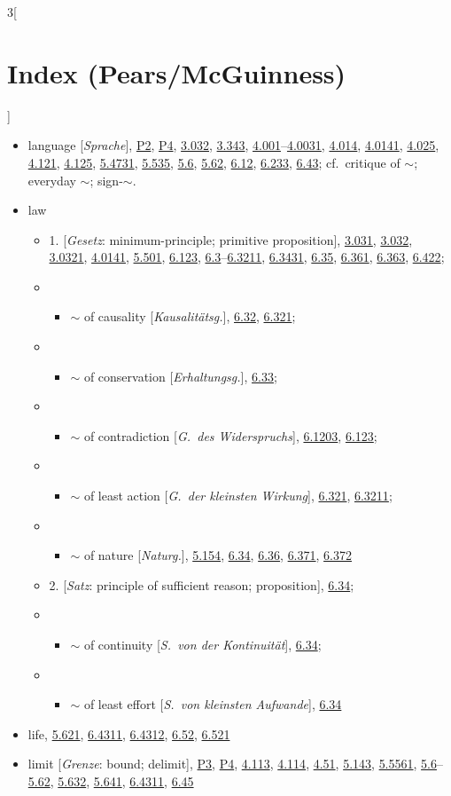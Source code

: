 \documentclass[oneside,openany,12pt]{book}
\newcommand{\indexentry}[1]{\item #1}
\newcommand{\indexsubentry}[1]{\begin{itemize} \item #1 \end{itemize}}
\newcommand{\indexsubsubentry}[1]{\begin{itemize} \item \begin{itemize} \item #1 \end{itemize} \end{itemize}}
\newcommand{\indexref}[1]{\hyperlink{prop#1}{#1}}
\newcommand{\indexgap}{\bigskip}
\begin{document}
\begin{multicols}{3}[\section*{Index (Pears/McGuinness)}]
\begin{itemize}
\indexgap

\indexentry{language [\textit{Sprache}], \hyperlink{pref2}{P2}, \hyperlink{pref4}{P4}, \indexref{3.032}, \indexref{3.343}, \indexref{4.001}--\indexref{4.0031}, \indexref{4.014}, \indexref{4.0141}, \indexref{4.025}, \indexref{4.121}, \indexref{4.125}, \indexref{5.4731}, \indexref{5.535}, \indexref{5.6}, \indexref{5.62}, \indexref{6.12}, \indexref{6.233}, \indexref{6.43}; cf.\ critique of $\sim$; everyday $\sim$; sign-$\sim$.}

\indexentry{law}

   \indexsubentry{1. [\textit{Gesetz}: minimum-principle; primitive proposition], \indexref{3.031}, \indexref{3.032}, \indexref{3.0321}, \indexref{4.0141}, \indexref{5.501}, \indexref{6.123}, \indexref{6.3}--\indexref{6.3211}, \indexref{6.3431}, \indexref{6.35}, \indexref{6.361}, \indexref{6.363}, \indexref{6.422};}

   \indexsubsubentry{$\sim$ of causality [\textit{Kausalit{\"a}tsg.}], \indexref{6.32}, \indexref{6.321};}

   \indexsubsubentry{$\sim$ of conservation [\textit{Erhaltungsg.}], \indexref{6.33};}

   \indexsubsubentry{$\sim$ of contradiction [\textit{G.\ des Widerspruchs}], \indexref{6.1203}, \indexref{6.123};}

   \indexsubsubentry{$\sim$ of least action [\textit{G.\ der kleinsten Wirkung}], \indexref{6.321}, \indexref{6.3211};}
   \indexsubsubentry{$\sim$ of nature [\textit{Naturg.}], \indexref{5.154}, \indexref{6.34}, \indexref{6.36}, \indexref{6.371}, \indexref{6.372}}

   \indexsubentry{2. [\textit{Satz}: principle of sufficient reason; proposition], \indexref{6.34};}

   \indexsubsubentry{$\sim$ of continuity [\textit{S.\ von der Kontinuit{\"a}t}], \indexref{6.34};}

   \indexsubsubentry{$\sim$ of least effort [\textit{S.\ von kleinsten Aufwande}], \indexref{6.34}}

\indexentry{life, \indexref{5.621}, \indexref{6.4311}, \indexref{6.4312}, \indexref{6.52}, \indexref{6.521}}

\indexentry{limit [\textit{Grenze}: bound; delimit], \hyperlink{pref3}{P3}, \hyperlink{pref4}{P4}, \indexref{4.113}, \indexref{4.114}, \indexref{4.51}, \indexref{5.143}, \indexref{5.5561}, \indexref{5.6}--\indexref{5.62}, \indexref{5.632}, \indexref{5.641}, \indexref{6.4311}, \indexref{6.45}}


\end{itemize}
\end{multicols}
\end{document}
